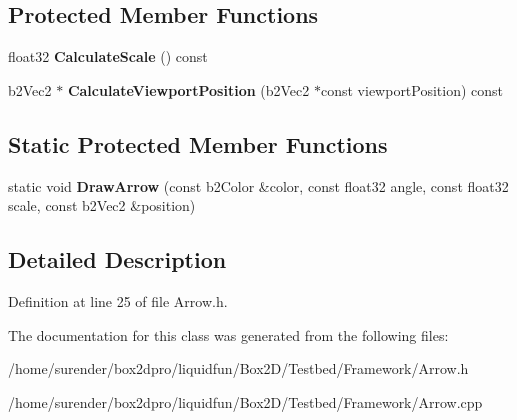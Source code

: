 \subsection*{Protected Member Functions}
\begin{DoxyCompactItemize}
\item 
\hypertarget{classArrow_a97d389c01a79a3a53492ea61781e2e58}{float32 {\bfseries Calculate\-Scale} () const }\label{classArrow_a97d389c01a79a3a53492ea61781e2e58}

\item 
\hypertarget{classArrow_ae1f8ce58937ecd59bbc5527879d6fa73}{b2\-Vec2 $\ast$ {\bfseries Calculate\-Viewport\-Position} (b2\-Vec2 $\ast$const viewport\-Position) const }\label{classArrow_ae1f8ce58937ecd59bbc5527879d6fa73}

\end{DoxyCompactItemize}
\subsection*{Static Protected Member Functions}
\begin{DoxyCompactItemize}
\item 
\hypertarget{classArrow_ab5f952709ff30a90e6d49095099eebd2}{static void {\bfseries Draw\-Arrow} (const b2\-Color \&color, const float32 angle, const float32 scale, const b2\-Vec2 \&position)}\label{classArrow_ab5f952709ff30a90e6d49095099eebd2}

\end{DoxyCompactItemize}


\subsection{Detailed Description}


Definition at line 25 of file Arrow.\-h.



The documentation for this class was generated from the following files\-:\begin{DoxyCompactItemize}
\item 
/home/surender/box2dpro/liquidfun/\-Box2\-D/\-Testbed/\-Framework/Arrow.\-h\item 
/home/surender/box2dpro/liquidfun/\-Box2\-D/\-Testbed/\-Framework/Arrow.\-cpp\end{DoxyCompactItemize}
